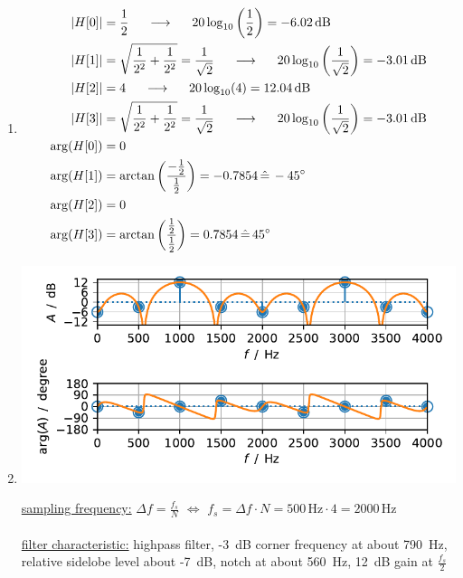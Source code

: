 \documentclass[11pt,a4paper,DIV=12]{scrartcl}
\begin{document}
\begin{Loesung}
\begin{enumerate}[label=\alph*)]
	\item \begin{align}
	|H[0]|&=\frac{1}{2} \hspace{5mm}\longrightarrow\hspace{5mm} 20\log_{10}\left(\frac{1}{2}\right)=-6.02\,\text{dB}\nonumber\\
	|H[1]|&=\sqrt{\frac{1}{2^2}+\frac{1}{2^2}}=\frac{1}{\sqrt{2}} \hspace{5mm}\longrightarrow\hspace{5mm} 20\log_{10}\left(\frac{1}{\sqrt{2}}\right)=-3.01\,\text{dB}\nonumber\\
	|H[2]|&=4 \hspace{5mm}\longrightarrow\hspace{5mm} 20\log_{10}(4)=12.04\,\text{dB}\nonumber\\
	|H[3]|&=\sqrt{\frac{1}{2^2}+\frac{1}{2^2}}=\frac{1}{\sqrt{2}} \hspace{5mm}\longrightarrow\hspace{5mm} 20\log_{10}\left(\frac{1}{\sqrt{2}}\right)=-3.01\,\text{dB}\nonumber\\
	\arg(H[0])&=0\nonumber\\
	\arg(H[1])&=\arctan\left(\frac{-\frac{1}{2}}{\frac{1}{2}}\right)=-0.7854\,\hat{=}\,-45^{\circ}\nonumber\\
	\arg(H[2])&=0\nonumber\\
	\arg(H[3])&=\arctan\left(\frac{\frac{1}{2}}{\frac{1}{2}}\right)=0.7854\,\hat{=}\,45^{\circ}\nonumber
	\end{align}
	\item \text{}
	\begin{center}%
		\includegraphics[]{graphics/UE1_Exercise4_Spectrum.pdf}%
	\end{center}%
	\underline{sampling frequency:} $\Delta f=\frac{f_s}{N}\,\,\Leftrightarrow\,\,f_s=\Delta f\cdot N=500\,\text{Hz}\cdot4=2000\,\text{Hz}$\\\\
	\underline{filter characteristic:} highpass filter, -3~dB corner frequency at
	about 790~Hz, relative sidelobe level about -7~dB, notch at about 560~Hz,
	12~dB gain at $\frac{f_s}{2}$
\end{enumerate}
\end{Loesung}
\end{document}
